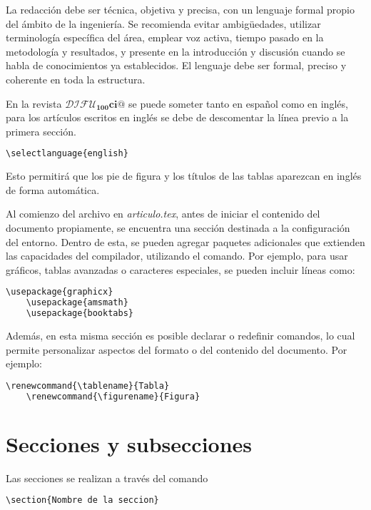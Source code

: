 \documentclass[12pt]{difu100cia} %
\begin{document}
La redacción debe ser técnica, objetiva y precisa, con un lenguaje formal propio del ámbito de la ingeniería. Se recomienda evitar ambigüedades, utilizar terminología específica del área, emplear voz activa, tiempo pasado en la metodología y resultados, y presente en la introducción y discusión cuando se habla de conocimientos ya establecidos. El lenguaje debe ser formal, preciso y coherente en toda la estructura.

En la revista $\boldsymbol{\mathcal{DIFU}_{100}ci@}$ se puede someter tanto en español como en inglés, para los artículos escritos en inglés se debe de descomentar la línea previo a la primera sección.

\begin{lstlisting}[language=bash]
    \selectlanguage{english} 
\end{lstlisting}

Esto permitirá que los pie de figura y los títulos de las tablas aparezcan en inglés de forma automática.

Al comienzo del archivo en \textit{articulo.tex}, antes de iniciar el contenido del documento propiamente, se encuentra una sección destinada a la configuración del entorno. Dentro de esta, se pueden agregar paquetes adicionales que extienden las capacidades del compilador, utilizando el comando. Por ejemplo, para usar gráficos, tablas avanzadas o caracteres especiales, se pueden incluir líneas como:

\begin{lstlisting}[language=bash]
    \usepackage{graphicx}
    \usepackage{amsmath}
    \usepackage{booktabs}    
\end{lstlisting}

Además, en esta misma sección es posible declarar o redefinir comandos, lo cual permite personalizar aspectos del formato o del contenido del documento. Por ejemplo:

\begin{lstlisting}[language=bash]
    \renewcommand{\tablename}{Tabla}
    \renewcommand{\figurename}{Figura}    
\end{lstlisting}

\section{Secciones y subsecciones}

Las secciones se realizan a través del comando 

\begin{lstlisting}[language=bash]
    \section{Nombre de la seccion} 
\end{lstlisting}
\end{document}
